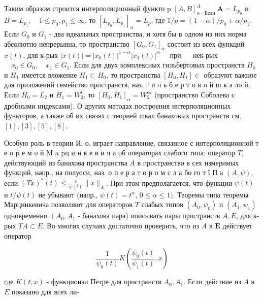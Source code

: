 \documentclass[10pt]{article}
\begin{document}
Таким образом строится интерполяционный функто $\mathrm{p}$ $[A, B]_{\alpha \cdot \text { Если }}^{A} \boldsymbol{A}=L_{p_{0}}$ и $B=L_{p_{1}}, \quad 1 \leqslant p_{0}, p_{1} \leqslant \infty$, то $\left[L_{p_{0}}, L_{p_{1}}\right]_{\alpha}=L_{p}$, где $1 / p=(1-\alpha) / p_{0}+\alpha / p_{1}$. Если $G_{0}$ и $G_{1}$ - два идеальных пространства, и хотя бы в одном из них норма абсолютно непрерывна, то пространство $\left[G_{0}, G_{1}\right]_{\alpha}$ состоит из всех функций $x(t)$, для к-рых $|x(t)|=\left|x_{0}(t)\right|^{1-\alpha}\left|x_{1}(t)\right|^{\alpha} \quad$ при $\quad$ нек-рых $\quad x_{0} \in G_{0}, \quad x_{1} \in G_{1}$. Если для двух комплексных гильбертовых пространств $H_{0}$ и $H_{1}$ имеется вложение $H_{1} \subset H_{0}$, то пространства $\left[H_{0}, H_{1}\right] \in$ образуют важное для приложений семейство пространств, наз. $\boldsymbol{г}$ и л ь б е р т о в о й ш к а ло й. Если $H_{0}=L_{2}$ и $H_{1}=W_{2}^{l}$, то $\left[H_{0}, H_{1}\right]_{\alpha}=W_{2}^{\alpha l}$ (пространство Соболева с дробными индексами). О других методах построения интерполяционных функторов, а также об их связях с теорией шкал банаховых пространств см. $[1],[3],[5],[8]$.



Особую роль в теории И. о. играет направление, связанное с интерполяционной т е о p е м о й M a pц и н к е в и ч а об операторах слабого типа: оператор $T$, действующий из банахова пространства $A$ в пространство в сех измеримых функций, напр., на полуоси, наз. о п е р а т о р о м с л а бо го т ї П а $(A, \psi)$, если $(T x)^{*}(t) \leqslant \frac{c}{\psi(t)}\|x\|_{A}$. При этом предполагается, что функции $\psi(t)$ и $t / \psi(t)$ не убывают (напр., $\psi(t)=t^{\alpha}$, $0 \leqslant \alpha \leqslant 1)$. Теоремы типа теоремы Марцинкевича позволяют для операторов $T$ слабых типов $\left(A_{0}, \psi_{0}\right)$ и $\left(A_{1}, \psi_{1}\right)$ одновременно $\left(A_{0}, A_{1}\right.$ - банахова пара) описывать пары пространств $A, E$, для к-рых $T A \subset E$. Во многих случаях достаточно проверить, что из $A$ в $\boldsymbol{E}$ действует оператор



\[

\frac{1}{\psi_{0}(t)} K\left(\frac{\psi_{0}(t)}{\psi_{1}(t)}, x\right)

\]



где $K(t, x)$ - функционал Петре для пространств $A_{0}, A_{1}$. Если действие из $A$ в $E$ показано для всех ли-
\end{document}
